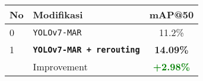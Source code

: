   \begin{tabular}{ l l c }
    \toprule[1.5pt]
    No & Modifikasi                                      &mAP@50 \\
    \midrule
    0  & \texttt{YOLOv7-MAR}                           & 11.2\%\\
    1  & \texttt{\textbf{YOLOv7-MAR + rerouting}} & \textbf{14.09\%}\\
    \midrule
       & Improvement                                & \textbf{\textcolor{green}{+2.98\%}}\\
    \bottomrule[1.5pt]
  \end{tabular}